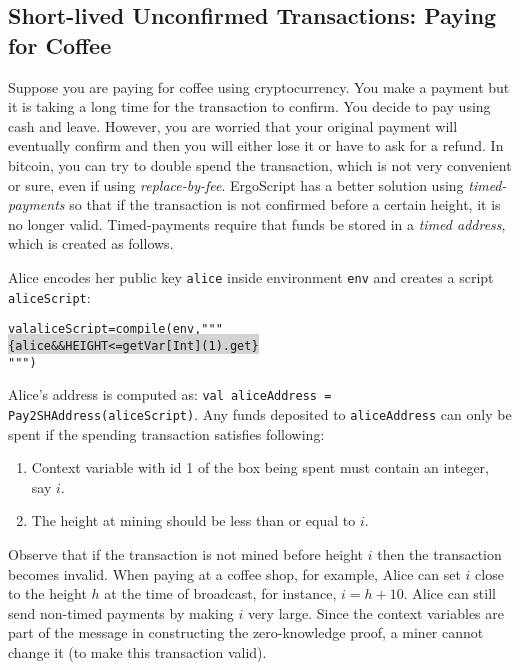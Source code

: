 \documentclass[11pt]{article}
\newcommand\Hi[2][lightgray]{%
	\hspace*{-\fboxsep}%
	\colorbox{#1}{#2}%
	\hspace*{-\fboxsep}%
}
\newcommand{\langname}{ErgoScript\xspace}
\begin{document}
\subsection{Short-lived Unconfirmed Transactions: Paying for Coffee}

Suppose you are paying for coffee using cryptocurrency. You make a payment but it is taking a long time for the transaction to confirm. You decide to pay using cash and leave. However, you are worried that your original payment will eventually confirm and then you will either lose it or have to ask for a refund. In bitcoin, you can try to double spend the transaction, which is not very convenient or sure, even if using {\em replace-by-fee}. \langname has a better solution using {\em timed-payments} so that if the transaction is not confirmed before a certain height, it is no longer valid. Timed-payments require that funds be stored in a {\em timed address}, which is created as follows. 

Alice encodes her public key \texttt{alice} inside environment \texttt{env} and creates a script \texttt{aliceScript}:
\begin{alltt}
	val aliceScript = compile(env, """ \Hi{\{alice && HEIGHT <= getVar[Int](1).get\}}""")
\end{alltt}

Alice's address is computed as: \texttt{val aliceAddress = Pay2SHAddress(aliceScript)}. Any funds deposited to \texttt{aliceAddress} can only be spent if the spending transaction satisfies following:
\begin{enumerate}
	\item Context variable with id 1 of the box being spent must contain an integer, say $i$.
	\item The height at mining should be less than or equal to $i$. 
\end{enumerate}

Observe that if the transaction is not mined before height $i$ then the transaction becomes invalid. When paying at a coffee shop, for example, Alice can set $i$ close to the height $h$ at the time of broadcast, for instance, $i = h + 10$. 
Alice can still send non-timed payments by making $i$ very large. Since the context variables are part of the message in constructing the zero-knowledge proof, a miner cannot change it (to make this transaction valid). 
\end{document}
